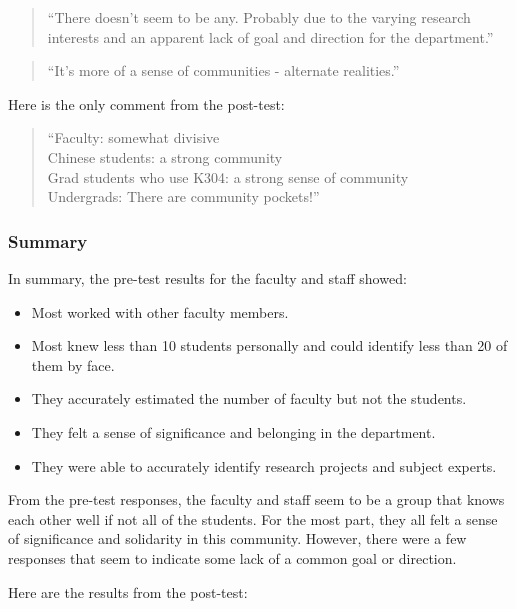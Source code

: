 \begin{quote}
``There doesn't seem to be any.  Probably due to the varying research interests
and an apparent lack of goal and direction for the department.''
\end{quote}

\begin{quote}
``It's more of a sense of communities - alternate realities.''
\end{quote}

Here is the only comment from the post-test:

\begin{quote}
``Faculty: somewhat divisive\\
Chinese students: a strong community\\
Grad students who use K304: a strong sense of community\\
Undergrads: There are community pockets!''
\end{quote}

\subsubsection{Summary}

In summary, the pre-test results for the faculty and staff showed:

\begin{itemize}
\item{Most worked with other faculty members.}
\item{Most knew less than 10 students personally and could identify less than
20 of them by face.}
\item{They accurately estimated the number of faculty but not the students.}
\item{They felt a sense of significance and belonging in the department.}
\item{They were able to accurately identify research projects and subject experts.}
\end{itemize}

From the pre-test responses, the faculty and staff seem to be a group that
knows each other well if not all of the students.  For the most part, they all
felt a sense of significance and solidarity in this community.  However, there
were a few responses that seem to indicate some lack of a common goal or
direction.

Here are the results from the post-test:

